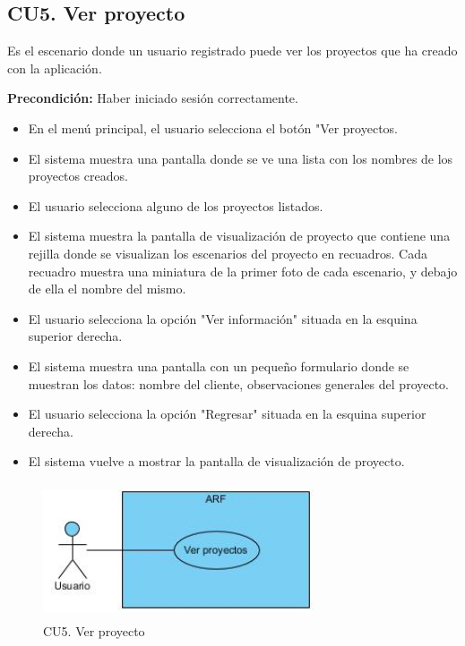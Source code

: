 \newpage
\subsection{CU5. Ver proyecto}\par
Es el escenario donde un usuario registrado puede ver los proyectos que ha creado con la aplicación.\par
\textbf{Precondición:} Haber iniciado sesión correctamente.\par
\begin{itemize}
	\item En el menú principal, el usuario selecciona el botón "Ver proyectos.
	\item El sistema muestra una pantalla donde se ve una lista con los nombres de los proyectos creados.
	\item El usuario selecciona alguno de los proyectos listados.
	\item El sistema muestra la pantalla de visualización de proyecto que contiene una rejilla donde se visualizan los escenarios del proyecto en recuadros. Cada recuadro muestra una miniatura de la primer foto de cada escenario, y debajo de ella el nombre del mismo.
	\item El usuario selecciona la opción "Ver información" situada en la esquina superior derecha.
	\item El sistema muestra una pantalla con un pequeño formulario donde se muestran los datos: nombre del cliente, observaciones generales del proyecto.
	\item El usuario selecciona la opción "Regresar" situada en la esquina superior derecha.
	\item El sistema vuelve a mostrar la pantalla de visualización de proyecto.
\end{itemize}

\begin{figure}[h!]
	\centering
	\includegraphics[width=8cm,height=4cm]{imagenes/analisis/cu/ver_proyectos.jpg}
	\caption{CU5. Ver proyecto}
	\label{fig:verproyecto}
\end{figure} 

